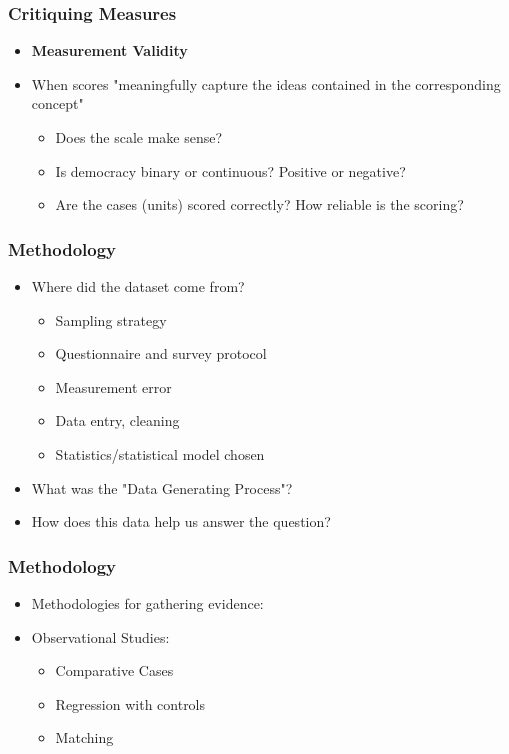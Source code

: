 \documentclass[xcolor=x11names,compress]{beamer}\usepackage[]{graphicx}\usepackage[]{color}
\renewcommand{\(}{\begin{columns}}
\renewcommand{\)}{\end{columns}}
\newcommand{\<}[1]{\begin{column}{#1}}
\renewcommand{\>}{\end{column}}
\begin{document}
\begin{frame}
\frametitle{Critiquing Measures}
\begin{itemize}
\item \textbf{Measurement Validity}
\pause
\item When scores "meaningfully capture the ideas contained in the corresponding concept"
\pause
\begin{itemize}
\item Does the scale make sense? 
\pause
\item Is democracy binary or continuous? Positive or negative?
\pause
\item Are the cases (units) scored correctly? How reliable is the scoring?
\end{itemize}
\end{itemize}
\end{frame}




\begin{frame}
\frametitle{Methodology}
\begin{itemize}
\item Where did the dataset come from?
\pause
\begin{itemize}
\item Sampling strategy
\pause
\item Questionnaire and survey protocol
\pause
\item Measurement error
\pause
\item Data entry, cleaning
\pause
\item Statistics/statistical model chosen
\pause
\end{itemize}
\item What was the "Data Generating Process"?
\item How does this data help us answer the question?
\end{itemize}
\end{frame}

\begin{frame}
\frametitle{Methodology}
\begin{itemize}
\item Methodologies for gathering evidence:
\pause
\item Observational Studies:
\begin{itemize}
\item Comparative Cases
\pause
\item Regression with controls
\pause
\item Matching
\end{itemize}
\end{itemize}
\end{frame}
\end{document}
